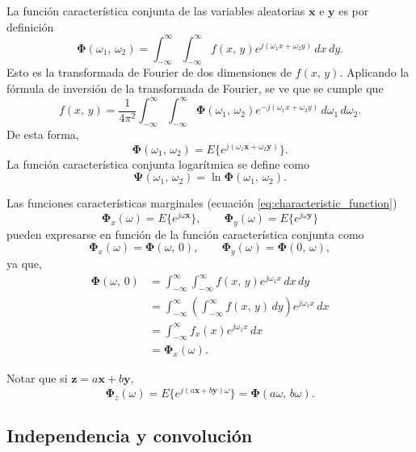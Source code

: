 \documentclass[a4paper]{report}
\newcommand{\x}{\mathbf{x}}
\newcommand{\y}{\mathbf{y}}
\newcommand{\z}{\mathbf{z}}
\newcommand{\Phibf}{\mathbf{\Phi}}
\newcommand{\Psibf}{\mathbf{\Psi}}
\begin{document}
La función característica conjunta de las variables aleatorias \(\x\) e \(\y\) es por definición
\begin{equation}\label{eq:joint_characteristic_function_definition}
 \Phibf(\omega_1,\,\omega_2)=\int_{-\infty}^{\infty}\int_{-\infty}^{\infty}f(x,\,y)e^{j(\omega_1x+\omega_2y)}\,dx\,dy.
\end{equation}
Esto es la transformada de Fourier de dos dimensiones de \(f(x,\,y)\). Aplicando la fórmula de inversión de la transformada de Fourier, se ve que se cumple que
\begin{equation}\label{eq:joint_characteristic_inverse_function}
 f(x,\,y)=\frac{1}{4\pi^2}\int_{-\infty}^{\infty}\int_{-\infty}^{\infty}\Phibf(\omega_1,\,\omega_2)e^{-j(\omega_1x+\omega_2y)}\,d\omega_1\,d\omega_2.
\end{equation}
De esta forma,
\[
 \Phibf(\omega_1,\,\omega_2)=E\{e^{j(\omega_1\x+\omega_2\y)}\}.
\]
La función característica conjunta logarítmica se define como
\[
 \Psibf(\omega_1,\,\omega_2)=\ln\Phibf(\omega_1,\,\omega_2).
\]

Las funciones características marginales (ecuación \ref{eq:characteristic_function})
\[
 \Phibf_x(\omega)=E\{e^{j\omega\x}\},\qquad \Phibf_y(\omega)=E\{e^{j\omega\y}\}
\]
pueden expresarse en función de la función característica conjunta como
\[
 \Phibf_x(\omega)=\Phibf(\omega,\,0),\qquad \Phibf_y(\omega)=\Phibf(0,\,\omega),
\]
ya que, 
\begin{align*}
 \Phibf(\omega,\,0)&=\int_{-\infty}^{\infty}\int_{-\infty}^{\infty}f(x,\,y)e^{j\omega_1x}\,dx\,dy\\
  &=\int_{-\infty}^{\infty}\left(\int_{-\infty}^{\infty}f(x,\,y)\,dy\right)e^{j\omega_1x}\,dx\\
  &=\int_{-\infty}^{\infty}f_x(x)e^{j\omega_1x}\,dx\\
  &=\Phibf_x(\omega).
\end{align*}

Notar que si \(\z=a\x+b\y\),
\begin{equation}\label{eq:characteristic_function_linear_combination}
 \Phibf_z(\omega)=E\{e^{j(a\x+b\y)\omega}\}=\Phibf(a\omega,\,b\omega).
\end{equation}

\subsection{Independencia y convolución}\label{sec:two_rv_independence_and_convolution}
\end{document}
